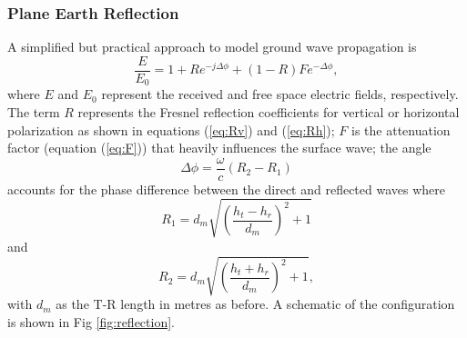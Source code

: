 \documentclass[10pt,journal,twoside]{IEEEtran}
\begin{document}
\subsubsection{Plane Earth Reflection}
A simplified but practical approach to model ground wave propagation is  \cite{Norton37,Angelakos} %
\begin{equation}
\label{eq:ground_wave_set}
\dfrac{E}{E_0} = 1 + Re^{-j\Delta\phi} + \left( 1 - R \right)Fe^{-\Delta\phi},
\end{equation}
where $E$ and $E_0$ represent the received and free space electric fields, respectively. The term $R$ represents the Fresnel reflection coefficients for vertical or horizontal polarization as shown in equations (\ref{eq:Rv}) and (\ref{eq:Rh}); $F$ is the attenuation factor (equation (\ref{eq:F})) that heavily influences the surface wave; the angle
\begin{equation}
\Delta\phi = \dfrac{\omega}{c} \left(R_2 - R_1\right)
\end{equation}
accounts for the phase difference between the direct and reflected waves where
\[ R_1 = d_m \sqrt{\left(\dfrac{h_t - h_r}{d_m} \right)^2 + 1} \]
and 
\[ R_2 = d_m \sqrt{\left(\dfrac{h_t + h_r}{d_m} \right)^2 + 1}, \]
with $d_m$ as the T-R length in metres as before. A schematic of the configuration is shown in Fig \ref{fig:reflection}.
\end{document}
